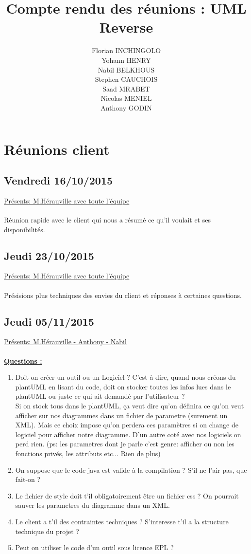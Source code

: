 \documentclass[a4paper,10pt]{article}
\title{Compte rendu des réunions : UML Reverse}
\author{
Florian INCHINGOLO\\ 
Yohann HENRY\\ 
Nabil BELKHOUS\\ 
Stephen CAUCHOIS\\ 
Saad MRABET\\ 
Nicolas MENIEL\\ 
Anthony GODIN}
\begin{document}
\maketitle
\tableofcontents
\newpage

\section{Réunions client}
\subsection{Vendredi 16/10/2015}
\underline{Présents: M.Hérauville avec toute l'équipe}
\\ \\
Réunion rapide avec le client qui nous a résumé ce qu'il voulait et ses disponibilités.
\subsection{Jeudi 23/10/2015}
\underline{Présents: M.Hérauville avec toute l'équipe}
\\ \\
Présisions plus techniques des envies du client et réponses à certaines questions.
\subsection{Jeudi 05/11/2015}
\underline{Présents: M.Hérauville - Anthony - Nabil}
\\ \\
\textbf{\underline{Questions :}}
\begin{enumerate}
  \item Doit-on créer un outil ou un Logiciel ? C'est à dire, quand nous créons du plantUML en lisant du code, doit on stocker toutes les infos lues dans
  le plantUML ou juste ce qui ait demandé par l'utilisateur ?\\
  Si on stock tous dans le plantUML, ça veut dire qu'on définira ce qu'on veut afficher sur nos diagrammes dans un fichier de parametre (surement un XML). 
  Mais ce choix impose qu'on perdera ces paramètres si on change de logiciel pour afficher notre diagramme. D'un autre coté avec nos logiciels on perd rien.
  (ps: les parametres dont je parle c'est genre: afficher ou non les fonctions privés, les attributs etc... Rien de plus)
  \item On suppose que le code java est valide à la compilation ? S'il ne l'air pas, que fait-on ?
  \item Le fichier de style doit t'il obligatoirement être un fichier css ? On pourrait sauver les parametres du diagramme dans un XML.
  \item Le client a t'il des contraintes techniques ? S'interesse t'il a la structure technique du projet ?
  \item Peut on utiliser le code d'un outil sous licence EPL ?
\end{enumerate}
\end{document}
